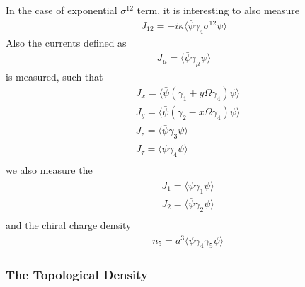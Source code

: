 In the case of exponential $\sigma ^{12}$ term, it is interesting to also measure
\begin{equation}
\begin{split}
J_{12}=-i\kappa \langle \bar{\psi} \gamma _4 \sigma ^{12} \psi \rangle
\end{split}
\end{equation}
Also the currents defined as
\begin{equation}
\begin{split}
J_{\mu}=\langle \bar{\psi} \gamma _{\mu} \psi \rangle
\end{split}
\end{equation}
is measured, such that
\begin{equation}
\begin{split}
&J_x=\langle \bar{\psi} (\gamma _1+y\Omega \gamma _4) \psi \rangle\\
&J_y=\langle \bar{\psi} (\gamma _2-x\Omega \gamma _4) \psi \rangle\\
&J_z=\langle \bar{\psi} \gamma _3 \psi \rangle\\
&J_{\tau}=\langle \bar{\psi} \gamma _4 \psi \rangle\\
\end{split}
\end{equation}
we also measure the
\begin{equation}
\begin{split}
&J_1=\langle \bar{\psi} \gamma _1 \psi \rangle\\
&J_2=\langle \bar{\psi} \gamma _2 \psi \rangle\\
\end{split}
\end{equation}
and the chiral charge density
\begin{equation}
\begin{split}
&n_5=a^3\langle \bar{\psi} \gamma _4\gamma _5\psi \rangle
\end{split}
\end{equation}

\subsubsection{\label{sec:RotatingTopologicalDensity}The Topological Density}

